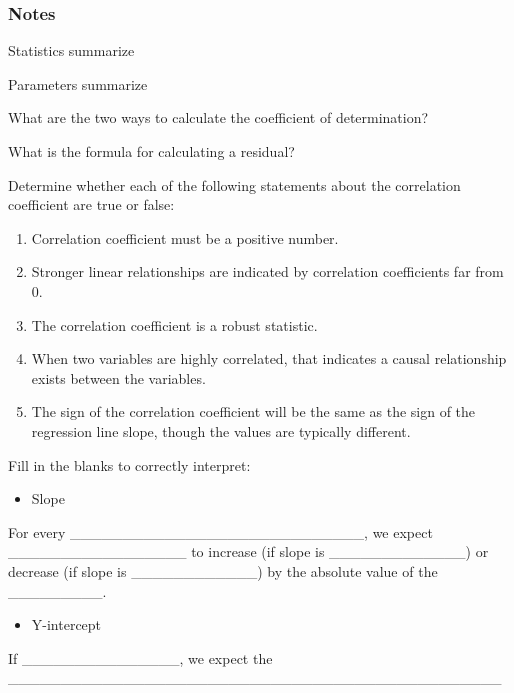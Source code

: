 \documentclass[
]{report}
\providecommand{\tightlist}{%
  \setlength{\itemsep}{0pt}\setlength{\parskip}{0pt}}
\newcommand{\rgs}{\vspace{12pt}} %
\newcommand{\rgi}{\hspace{24pt}}  %
\begin{document}
\hypertarget{notes-11}{%
\subsubsection*{Notes}\label{notes-11}}

Statistics summarize
\rgs

Parameters summarize
\rgs

What are the two ways to calculate the coefficient of determination?
\rgs

What is the formula for calculating a residual?
\rgs

Determine whether each of the following statements about the correlation coefficient are true or false:

\begin{enumerate}
\def\labelenumi{\arabic{enumi}.}
\item
  Correlation coefficient must be a positive number.
\item
  Stronger linear relationships are indicated by correlation coefficients far from 0.
\item
  The correlation coefficient is a robust statistic.
\item
  When two variables are highly correlated, that indicates a causal relationship exists between the variables.
\item
  The sign of the correlation coefficient will be the same as the sign of the regression line slope, though the values are typically different.
\end{enumerate}

Fill in the blanks to correctly interpret:

\begin{itemize}
\tightlist
\item
  Slope
\end{itemize}

\rgi For every \_\_\_\_\_\_\_\_\_\_\_\_\_\_\_\_\_\_\_\_\_\_\_\_\_\_\_\_, we expect \_\_\_\_\_\_\_\_\_\_\_\_\_\_\_\_\_ to increase (if slope is \_\_\_\_\_\_\_\_\_\_\_\_\_) or decrease (if slope is \_\_\_\_\_\_\_\_\_\_\_\_) by the absolute value of the \_\_\_\_\_\_\_\_\_.

\begin{itemize}
\tightlist
\item
  Y-intercept
\end{itemize}

\rgi If \_\_\_\_\_\_\_\_\_\_\_\_\_\_\_, we expect the \_\_\_\_\_\_\_\_\_\_\_\_\_\_\_\_\_\_\_\_\_\_\_\_\_\_\_\_\_\_\_\_\_\_\_\_\_\_\_\_\_\_\_\_\_\_\_
\end{document}
